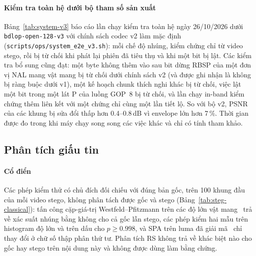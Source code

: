 \documentclass[journal]{IEEEtran}
\begin{document}


\paragraph{Kiểm tra toàn hệ dưới bộ tham số sản xuất}
Bảng~\ref{tab:system-v3} báo cáo lần chạy kiểm tra toàn hệ ngày 26/10/2026 dưới
\texttt{bdlop-open-128-v3} với chính sách codec v2 làm mặc định
(\texttt{scripts/ops/system\_e2e\_v3.sh}): mỗi chế độ nhúng, kiểm chứng chỉ từ
video stego, rồi bị từ chối khi phát lại phiên đã tiêu thụ và khi một bit bị
lật. Các kiểm tra bổ sung cũng đạt: một byte không thêm vào sau bit dừng RBSP
của một đơn vị NAL mang vật mang bị từ chối dưới chính sách v2 (và được ghi nhận
là không bị ràng buộc dưới v1), một kế hoạch chunk thích nghi khác bị từ chối,
việc lật một bit trong một lát P của luồng GOP~8 bị từ chối, và lần chạy in-band
kiểm chứng thêm liên kết với một chứng chỉ cùng một lần tiết lộ. So với bộ v2,
PSNR của các khung bị sửa đổi thấp hơn 0.4--0.8\,dB vì envelope lớn hơn 7\,\%.
Thời gian được đo trong khi máy chạy song song các việc khác và chỉ có tính
tham khảo.



\subsection{Phân tích giấu tin}
\paragraph{Cổ điển} Các phép kiểm thử có chủ đích đối chiếu với đúng bản gốc,
trên 100 khung đầu của mỗi video stego, không phân tách được gốc và stego
(Bảng~\ref{tab:steg-classical}): tấn công cặp-giá-trị Westfeld--Pfitzmann trên
các độ lớn vật mang~\cite{ref:westfeld} trả về xác suất nhúng bằng không cho cả
gốc lẫn stego, các phép kiểm hai mẫu trên histogram độ lớn và trên dấu cho
$p\ge0.998$, và SPA trên luma đã giải mã~\cite{ref:spa} chỉ thay đổi ở chữ số
thập phân thứ tư. Phân tích RS không trả về khác biệt nào cho gốc hay stego
trên nội dung này và không được dùng làm bằng chứng.


\end{document}
